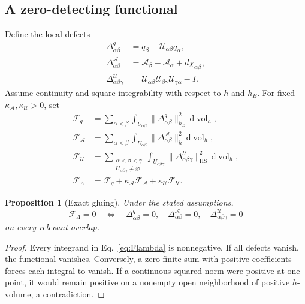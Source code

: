 \documentclass[10pt,oneside]{article}
\theoremstyle{plaincompact}
\newtheorem{proposition}[theorem]{Proposition}
\theoremstyle{definitioncompact}
\newcommand{\vol}{\operatorname{vol}}
\newcommand{\Ad}{\mathcal A}
\newcommand{\cF}{\mathcal F}
\newcommand{\cU}{\mathcal U}
\newcommand{\dd}{\,\mathrm d}
\begin{document}
\subsection{A zero-detecting functional}

Define the local defects
\begin{align}
\Delta^q_{\alpha\beta}
  &=q_\beta-\cU_{\alpha\beta}q_\alpha,
  \label{eq:qdefect}\\
\Delta^{\Ad}_{\alpha\beta}
  &=\Ad_\beta-\Ad_\alpha+d\chi_{\alpha\beta},
  \label{eq:Adefect}\\
\Delta^{\cU}_{\alpha\beta\gamma}
  &=\cU_{\alpha\beta}\cU_{\beta\gamma}
    \cU_{\gamma\alpha}-I.
  \label{eq:Udefect}
\end{align}
Assume continuity and square-integrability with respect to $h$ and $h_E$.
For fixed $\kappa_{\Ad},\kappa_{\cU}>0$, set
\begin{align}
\cF_q
  &=\sum_{\alpha<\beta}\int_{U_{\alpha\beta}}
    \|\Delta^q_{\alpha\beta}\|_{h_E}^2\dd\vol_h,
  \label{eq:Fq}\\
\cF_{\Ad}
  &=\sum_{\alpha<\beta}\int_{U_{\alpha\beta}}
    \|\Delta^{\Ad}_{\alpha\beta}\|_{h}^2\dd\vol_h,
  \label{eq:FA}\\
\cF_{\cU}
  &=\sum_{\substack{\alpha<\beta<\gamma\\
      U_{\alpha\beta\gamma}\ne\varnothing}}
    \int_{U_{\alpha\beta\gamma}}
    \|\Delta^{\cU}_{\alpha\beta\gamma}\|_{\mathrm{HS}}^2\dd\vol_h,
  \label{eq:FU}\\
\cF_\Lambda
  &=\cF_q+\kappa_{\Ad}\cF_{\Ad}
    +\kappa_{\cU}\cF_{\cU}.
  \label{eq:Flambda}
\end{align}

\begin{proposition}[Exact gluing]\label{prop:gluing}
Under the stated assumptions,
\begin{equation}\label{eq:gluingiff}
\cF_\Lambda=0
\quad\Longleftrightarrow\quad
\Delta^q_{\alpha\beta}=0,
\quad\Delta^{\Ad}_{\alpha\beta}=0,
\quad\Delta^{\cU}_{\alpha\beta\gamma}=0
\end{equation}
on every relevant overlap.
\end{proposition}

\begin{proof}
Every integrand in Eq.~\eqref{eq:Flambda} is nonnegative.  If all defects
vanish, the functional vanishes.  Conversely, a zero finite sum with positive
coefficients forces each integral to vanish.  If a continuous squared norm
were positive at one point, it would remain positive on a nonempty open
neighborhood of positive $h$-volume, a contradiction.
\end{proof}
\end{document}
